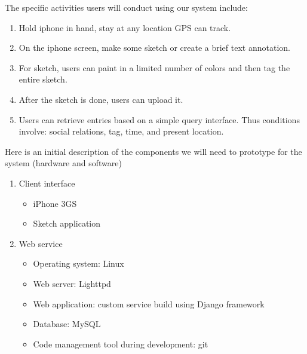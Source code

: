 \documentclass{article}
\begin{document}
The specific activities users will conduct using our system include:
\begin{enumerate}
\item Hold iphone in hand, stay at any location GPS can track.
\item On the iphone screen, make some sketch or create a brief text annotation.
\item For sketch, users can paint in a limited number of colors and then tag the entire sketch.
\item After the sketch is done, users can upload it.
\item Users can retrieve entries based on a simple query interface. Thus conditions involve: social relations, tag, time, and present location.
\end{enumerate}

Here is an initial description of the components we will need to prototype for the system (hardware and software)
\begin{enumerate}
\item Client interface
	\begin{itemize}
	\item iPhone 3GS
	\item  Sketch application
	\end{itemize}

\item Web service
	\begin{itemize}
	\item Operating system: Linux
	\item Web server: Lighttpd
	\item Web application: custom service build using Django framework
	\item Database: MySQL
	\item Code management tool during development: git
	\end{itemize}
\end{enumerate}


 
\end{document}
